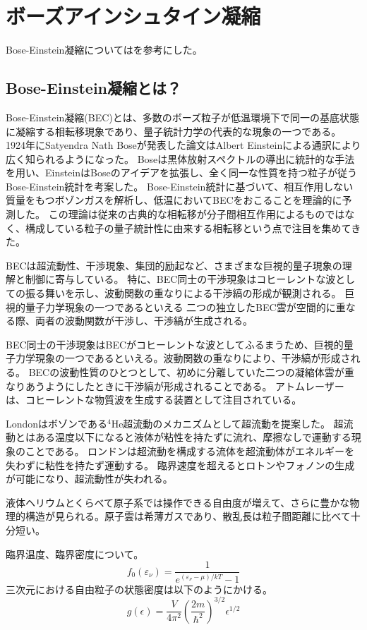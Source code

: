 \newpage
\section{ボーズアインシュタイン凝縮}
Bose-Einstein凝縮については\cite{Pethick2008}を参考にした。
\subsection{Bose-Einstein凝縮とは？}
Bose-Einstein凝縮(BEC)とは、多数のボーズ粒子が低温環境下で同一の基底状態に凝縮する相転移現象であり、量子統計力学の代表的な現象の一つである。
1924年にSatyendra Nath Boseが発表した論文はAlbert Einsteinによる通訳により広く知られるようになった。
Boseは黒体放射スペクトルの導出に統計的な手法を用い、EinsteinはBoseのアイデアを拡張し、全く同一な性質を持つ粒子が従うBose-Einstein統計を考案した。
Bose-Einstein統計に基づいて、相互作用しない質量をもつボゾンガスを解析し、低温においてBECをおこることを理論的に予測した。
この理論は従来の古典的な相転移が分子間相互作用によるものではなく、構成している粒子の量子統計性に由来する相転移という点で注目を集めてきた。

BECは超流動性、干渉現象、集団的励起など、さまざまな巨視的量子現象の理解と制御に寄与している。
特に、BEC同士の干渉現象はコヒーレントな波としての振る舞いを示し、波動関数の重なりによる干渉縞の形成が観測される。
巨視的量子力学現象の一つであるといえる
二つの独立したBEC雲が空間的に重なる際、両者の波動関数が干渉し、干渉縞が生成される。

BEC同士の干渉現象はBECがコヒーレントな波としてふるまうため、巨視的量子力学現象の一つであるといえる。波動関数の重なりにより、干渉縞が形成される。
BECの波動性質のひとつとして、初めに分離していた二つの凝縮体雲が重なりあうようにしたときに干渉縞が形成されることである。
アトムレーザーは、コヒーレントな物質波を生成する装置として注目されている。

Londonはボゾンである$^4$He超流動のメカニズムとして超流動を提案した。
超流動とはある温度以下になると液体が粘性を持たずに流れ、摩擦なしで運動する現象のことである。
ロンドンは超流動を構成する流体を超流動体がエネルギーを失わずに粘性を持たず運動する。
臨界速度を超えるとロトンやフォノンの生成が可能になり、超流動性が失われる。

液体ヘリウムとくらべて原子系では操作できる自由度が増えて、さらに豊かな物理的構造が見られる。原子雲は希薄ガスであり、散乱長は粒子間距離に比べて十分短い。

臨界温度、臨界密度について。
\begin{equation}
f_0(\varepsilon_\nu) = \frac{1}{e^{(\varepsilon_\nu - \mu) / kT} - 1}
\end{equation}
三次元における自由粒子の状態密度は以下のようにかける。
\[
g(\epsilon) = \frac{V}{4\pi^2} \left( \frac{2m}{\hbar^2} \right)^{3/2} \epsilon^{1/2}
\]


